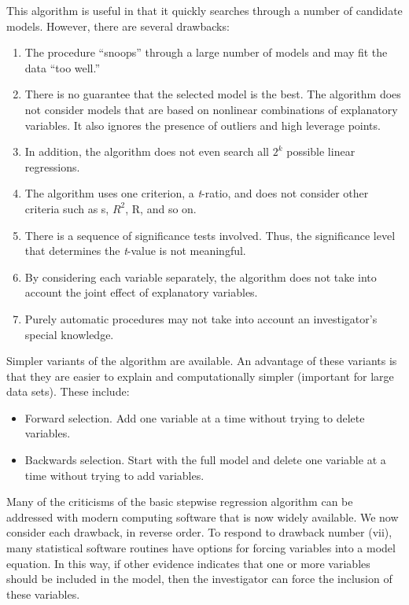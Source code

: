 This algorithm is useful in that it quickly searches through a number of
candidate models. However, there are several drawbacks:
\begin{enumerate}

\item The procedure ``snoops'' through a large number of models and may
fit the data ``too well.''

\item There is no guarantee that the selected model is the best. The algorithm
does not consider models that are based on nonlinear combinations of
explanatory variables. It also ignores the presence of outliers and
high leverage points.

  \item In addition, the algorithm does not even search all $2^{k}$ possible
linear regressions.

  \item The algorithm uses one criterion, a \textit{t}-ratio, and does not
consider other criteria such as s, $R^{2}$, R, and so on.

  \item There is a sequence of significance tests involved. Thus, the
significance level that determines the \textit{t}-value is not
meaningful.

  \item By considering each variable separately, the algorithm does not take into
account the joint effect of explanatory variables.

  \item Purely automatic procedures may not take into account an investigator's
special knowledge.

\end{enumerate}

Simpler variants of the algorithm are available. An advantage of
these variants is that they are easier to explain and
computationally simpler (important for large data sets). These
include:

\begin{itemize}
\item Forward selection. Add one variable at a time without trying
to delete variables.

\item Backwards selection. Start with the full model and delete one variable at
a time without trying to add variables.

\end{itemize}

Many of the criticisms of the basic stepwise regression algorithm
can be addressed with modern computing software that is now widely
available. We now consider each drawback, in reverse order. To
respond to drawback number (vii), many statistical software routines
have options for forcing variables into a model equation. In this
way, if other evidence indicates that one or more variables should
be included in the model, then the investigator can force the
inclusion of these variables.

